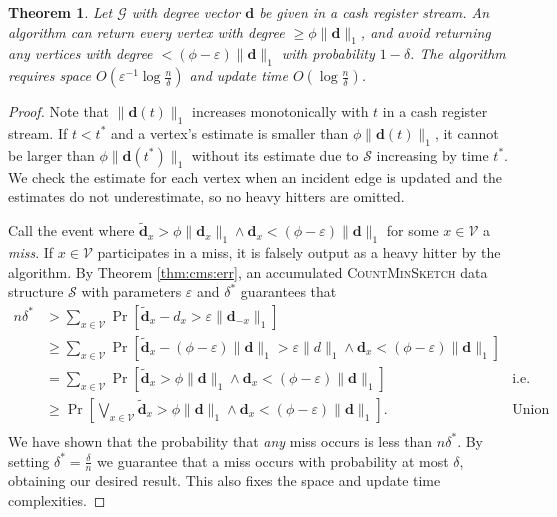 \documentclass[10]{report}
\newtheorem{theorem}{Theorem}[section]
\newcommand{\algoname}[1]{\textnormal{\textsc{#1}}}
\begin{document}
\begin{theorem} \label{thm:dchh:cashregister}
Let $\mathcal{G}$ with degree vector $\mathbf{d}$ be given in a cash register stream.
An algorithm can return every vertex with degree $\geq \phi \|\mathbf{d}\|_1$, and avoid returning any vertices with degree $< (\phi - \varepsilon)\|\mathbf{d}\|_1$ with probability $1-\delta$.
The algorithm requires space $O \left ( \varepsilon^{-1}\log \frac{n}{\delta} \right )$ and update time $O \left ( \log \frac{n}{\delta} \right )$.
\end{theorem}

\begin{proof}
Note that $\|\mathbf{d}(t)\|_1$ increases monotonically with $t$ in a cash register stream. 
If $t < t^*$ and a vertex's estimate is smaller than $\phi \|\mathbf{d}(t)\|_1$, it cannot be larger than $\phi \|\mathbf{d}(t^*)\|_1$ without its estimate due to $\mathcal{S}$ increasing by time $t^*$.
We check the estimate for each vertex when an incident edge is updated and the estimates do not underestimate, so no heavy hitters are omitted.

Call the event where $\widetilde{\mathbf{d}}_x > \phi \|\mathbf{d}_{x}\|_1 \wedge \mathbf{d}_x < (\phi - \varepsilon) \|\mathbf{d}\|_1$ for some $x \in \mathcal{V}$ a \emph{miss}.
If $x \in \mathcal{V}$ participates in a miss, it is falsely output as a heavy hitter by the algorithm.
By Theorem \ref{thm:cms:err}, an accumulated \algoname{CountMinSketch} data structure $\mathcal{S}$ with parameters $\varepsilon$ and $\delta^*$ guarantees that 
%
\begin{align*}
n\delta^* 
&>
\sum_{x \in \mathcal{V}} \Pr \left [ \widetilde{\mathbf{d}}_x - d_x > \varepsilon \|\mathbf{d}_{-x}\|_1 \right ] 
& \\
&\geq
\sum_{x \in \mathcal{V}} \Pr \left [ \widetilde{\mathbf{d}}_x - (\phi - \varepsilon)\|\mathbf{d}\|_1 > \varepsilon \|d\|_1 \wedge \mathbf{d}_x < (\phi - \varepsilon) \|\mathbf{d}\|_1 \right ] 
& \\
&=
\sum_{x \in \mathcal{V}} \Pr \left [ \widetilde{\mathbf{d}}_x > \phi \|\mathbf{d}\|_1 \wedge \mathbf{d}_x < (\phi - \varepsilon) \|\mathbf{d}\|_1 \right ] 
& \text{i.e. sum of misses}  \\
&\geq
\Pr \left [ \bigvee_{x \in \mathcal{V}} \widetilde{\mathbf{d}}_x > \phi \|\mathbf{d}\|_1 \wedge \mathbf{d}_x < (\phi - \varepsilon) \|\mathbf{d}\|_1 \right ].
& \text{Union bound} \\
\end{align*}
We have shown that the probability that \emph{any} miss occurs is less than $n\delta^*$.
By setting $\delta^* = \frac{\delta}{n}$ we guarantee that a miss occurs with probability at most $\delta$, obtaining our desired result.
This also fixes the space and update time complexities.
\end{proof}
\end{document}
